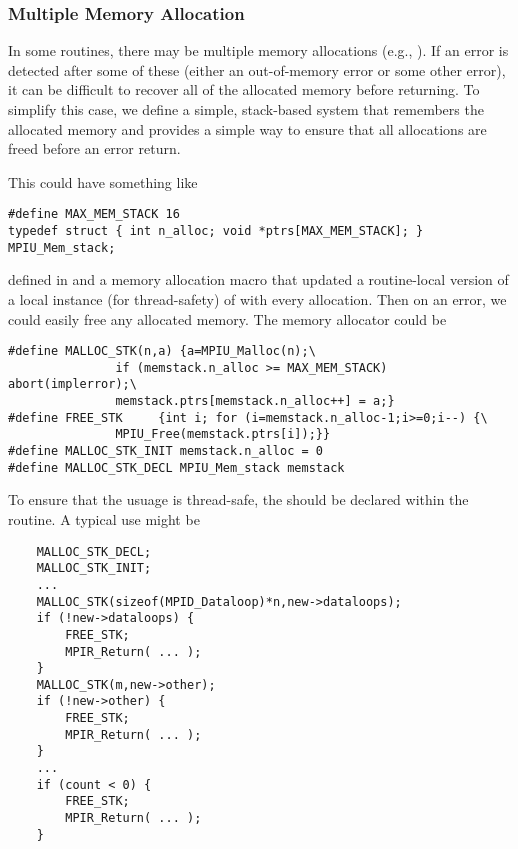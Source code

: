 \documentclass{article}
\begin{document}
\subsubsection{Multiple Memory Allocation}
In some routines, there may be multiple memory allocations (e.g.,
).  If an error is 
detected after some of these (either an out-of-memory error or some other
error), it can be difficult to recover all of the allocated memory before
returning.  To simplify this case, we define a simple, stack-based system that
remembers the allocated memory and provides a simple way to ensure that all
allocations are freed before an error return.


This could have something like
\begin{verbatim}
#define MAX_MEM_STACK 16
typedef struct { int n_alloc; void *ptrs[MAX_MEM_STACK]; } MPIU_Mem_stack;
\end{verbatim}
defined in  
and a memory allocation macro that updated a routine-local version of a
local instance (for thread-safety) of  
with every allocation.  Then on an error, we could easily free any allocated
memory.  The memory allocator could be
\begin{verbatim}
#define MALLOC_STK(n,a) {a=MPIU_Malloc(n);\
               if (memstack.n_alloc >= MAX_MEM_STACK) abort(implerror);\
               memstack.ptrs[memstack.n_alloc++] = a;}
#define FREE_STK     {int i; for (i=memstack.n_alloc-1;i>=0;i--) {\
               MPIU_Free(memstack.ptrs[i]);}}
#define MALLOC_STK_INIT memstack.n_alloc = 0
#define MALLOC_STK_DECL MPIU_Mem_stack memstack
\end{verbatim}


To ensure that the usuage is thread-safe, the \code{memstack} should be
declared within the routine.  A typical use might be
\begin{verbatim}
    MALLOC_STK_DECL;
    MALLOC_STK_INIT;
    ...
    MALLOC_STK(sizeof(MPID_Dataloop)*n,new->dataloops);
    if (!new->dataloops) {
        FREE_STK;
        MPIR_Return( ... );
    }
    MALLOC_STK(m,new->other);
    if (!new->other) {
        FREE_STK;
        MPIR_Return( ... );
    }
    ...
    if (count < 0) {
        FREE_STK; 
        MPIR_Return( ... );
    }
\end{verbatim}
\end{document}
